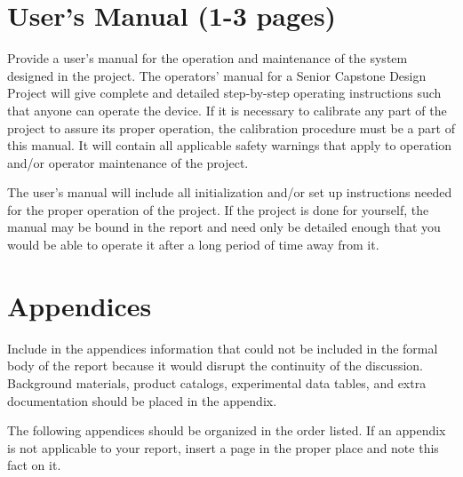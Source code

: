 \documentclass[12pt]{article}
\begin{document}
\section{User’s Manual (1-3 pages)}
Provide a user’s manual for the operation and maintenance of the system designed in the project. The operators' manual for a Senior Capstone Design Project will give complete and detailed step-by-step operating instructions such that anyone can operate the device. If it is necessary to calibrate any part of the project to assure its proper operation, the calibration procedure must be a part of this manual. It will contain all applicable safety warnings that apply to operation and/or operator maintenance of the project.

The user's manual will include all initialization and/or set up instructions needed for the proper operation of the project. If the project is done for yourself, the manual may be bound in the report and need only be detailed enough that you would be able to operate it after a long period of time away from it.

\section{Appendices}
Include in the appendices information that could not be included in the formal body of the report because it would disrupt the continuity of the discussion. Background materials, product catalogs, experimental data tables, and extra documentation should be placed in the appendix.

The following appendices should be organized in the order listed. If an appendix is not applicable to your report, insert a page in the proper place and note this fact on it.
\end{document}
